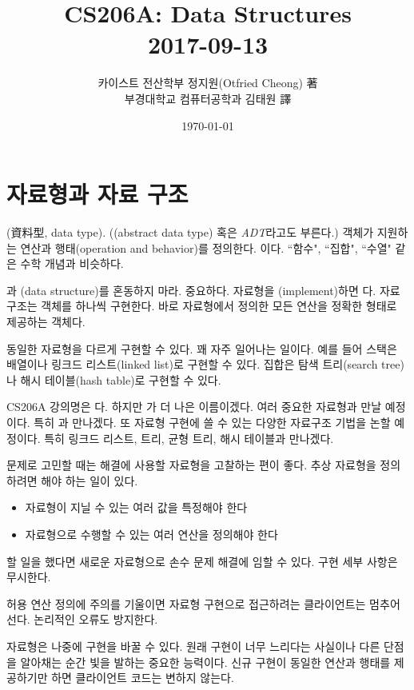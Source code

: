 \documentclass[a4paper]{oblivoir}
\title{CS206A: Data Structures\\2017-09-13}
\author{카이스트 전산학부 정지원(Otfried Cheong) 著\\부경대학교 컴퓨터공학과 김태원 譯}
\date{\today}
\begin{document}
\maketitle

\section*{자료형과 자료 구조}

(資料型, data type). ((abstract data type) 혹은 \emph{ADT}라고도 부른다.) 객체가 지원하는 연산과 행태(operation and behavior)를 정의한다. 이다. ``함수", ``집합", ``수열" 같은 수학 개념과 비슷하다.

과 (data structure)를 혼동하지 마라. 중요하다. 자료형을 (implement)하면 다. 자료 구조는 객체를 하나씩 구현한다. 바로 자료형에서 정의한 모든 연산을 정확한 형태로 제공하는 객체다.

동일한 자료형을 다르게 구현할 수 있다. 꽤 자주 일어나는 일이다. 예를 들어 스택은 배열이나 링크드 리스트(linked list)로 구현할 수 있다. 집합은 탐색 트리(search tree)나 해시 테이블(hash table)로 구현할 수 있다.

CS206A 강의명은 다. 하지만 가 더 나은 이름이겠다. 여러 중요한 자료형과 만날 예정이다. 특히 과 만나겠다. 또 자료형 구현에 쓸 수 있는 다양한 자료구조 기법을 논할 예정이다. 특히 링크드 리스트, 트리, 균형 트리, 해시 테이블과 만나겠다.

문제로 고민할 때는 해결에 사용할 자료형을 고찰하는 편이 좋다. 추상 자료형을 정의하려면 해야 하는 일이 있다.

\begin{itemize}
    \setlength\itemsep{-0.5em}
    \item 자료형이 지닐 수 있는 여러 값을 특정해야 한다
    \item 자료형으로 수행할 수 있는 여러 연산을 정의해야 한다
\end{itemize}

할 일을 했다면 새로운 자료형으로 손수 문제 해결에 임할 수 있다. 구현 세부 사항은 무시한다.

허용 연산 정의에 주의를 기울이면 자료형 구현으로 접근하려는 클라이언트는 멈추어 선다. 논리적인 오류도 방지한다. 

자료형은 나중에 구현을 바꿀 수 있다. 원래 구현이 너무 느리다는 사실이나 다른 단점을 알아채는 순간 빛을 발하는 중요한 능력이다. 신규 구현이 동일한 연산과 행태를 제공하기만 하면 클라이언트 코드는 변하지 않는다.  
\end{document}
